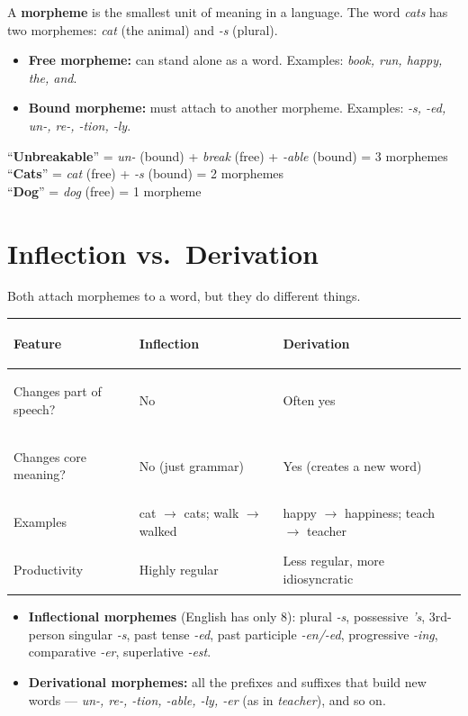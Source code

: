 \documentclass[11pt, letterpaper]{article}
\newcommand{\example}[1]{%
  \begin{tcolorbox}[colback=exbg, colframe=exborder,
    title={\bfseries Example}, arc=3pt, boxrule=1pt]
  #1
  \end{tcolorbox}%
}
\begin{document}
A \textbf{morpheme} is the smallest unit of meaning in a language. The word \emph{cats} has two morphemes: \emph{cat} (the animal) and \emph{-s} (plural).

\begin{itemize}[noitemsep]
  \item \textbf{Free morpheme:} can stand alone as a word. Examples: \emph{book, run, happy, the, and}.
  \item \textbf{Bound morpheme:} must attach to another morpheme. Examples: \emph{-s, -ed, un-, re-, -tion, -ly}.
\end{itemize}

\example{
``\textbf{Unbreakable}'' = \emph{un-} (bound) + \emph{break} (free) + \emph{-able} (bound) = 3 morphemes\\[4pt]
``\textbf{Cats}'' = \emph{cat} (free) + \emph{-s} (bound) = 2 morphemes\\[4pt]
``\textbf{Dog}'' = \emph{dog} (free) = 1 morpheme
}

\section*{Inflection vs.\ Derivation}

Both attach morphemes to a word, but they do different things.

\noindent
{\renewcommand{\arraystretch}{1.6}
\begin{tabularx}{\textwidth}{>{\bfseries\raggedright\arraybackslash}p{3cm}
                              >{\raggedright\arraybackslash}X
                              >{\raggedright\arraybackslash}X}
\toprule
\rowcolor{tableheaderpurple}
\textbf{Feature} & \textbf{Inflection} & \textbf{Derivation} \\
\midrule
\rowcolor{rowPu} Changes part of speech? & No                & Often yes \\
\rowcolor{rowA}  Changes core meaning?    & No (just grammar) & Yes (creates a new word) \\
\rowcolor{rowPu} Examples                 & cat $\to$ cats; walk $\to$ walked & happy $\to$ happiness; teach $\to$ teacher \\
\rowcolor{rowA}  Productivity             & Highly regular   & Less regular, more idiosyncratic \\
\bottomrule
\end{tabularx}}

\begin{itemize}[noitemsep]
  \item \textbf{Inflectional morphemes} (English has only 8): plural \emph{-s}, possessive \emph{'s}, 3rd-person singular \emph{-s}, past tense \emph{-ed}, past participle \emph{-en/-ed}, progressive \emph{-ing}, comparative \emph{-er}, superlative \emph{-est}.
  \item \textbf{Derivational morphemes:} all the prefixes and suffixes that build new words --- \emph{un-, re-, -tion, -able, -ly, -er} (as in \emph{teacher}), and so on.
\end{itemize}
\end{document}
